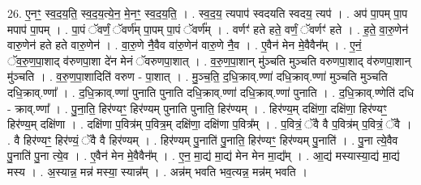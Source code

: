 \documentclass[17pt]{extarticle}
\begin{document}
26. ए॒नꣳ॒॒ स्व॒द॒य॒ति॒ स्व॒द॒य॒त्ये॒न॒ मे॒नꣳ॒॒ स्व॒द॒य॒ति॒ । . स्व॒द॒य॒ त्यपाप॑ स्वदयति स्वदय॒ त्यप॑ । . अप॑ पा॒पम् पा॒प मपाप॑ पा॒पम् । . पा॒पं ॅवर्णं॒ ॅवर्ण॑म् पा॒पम् पा॒पं ॅवर्ण᳚म् । . वर्णꣳ॑ हते हते॒ वर्णं॒ ॅवर्णꣳ॑ हते । . ह॒ते॒ वा॒रु॒णेन॑ वारु॒णेन॑ हते हते वारु॒णेन॑ । . वा॒रु॒णे नै॒वैव वा॑रु॒णेन॑ वारु॒णे नै॒व । . ए॒वैन॑ मेन मे॒वैवैन᳚म् । . ए॒नं॒ ॅव॒रु॒ण॒पा॒शाद् व॑रुणपा॒शा दे॑न मेनं ॅवरुणपा॒शात् । . व॒रु॒ण॒पा॒शान् मु॑ञ्चति मुञ्चति वरुणपा॒शाद् व॑रुणपा॒शान् मु॑ञ्चति । . व॒रु॒ण॒पा॒शादिति॑ वरुण - पा॒शात् । . मु॒ञ्च॒ति॒ द॒धि॒क्राव्.ण्णा॑ दधि॒क्राव्.ण्णा॑ मुञ्चति मुञ्चति दधि॒क्राव्.ण्णा᳚ । . द॒धि॒क्राव्.ण्णा॑ पुनाति पुनाति दधि॒क्राव्.ण्णा॑ दधि॒क्राव्.ण्णा॑ पुनाति । . द॒धि॒क्राव्.ण्णेति॑ दधि - क्राव्.ण्णा᳚ । . पु॒ना॒ति॒ हिर॑ण्यꣳ॒॒ हिर॑ण्यम् पुनाति पुनाति॒ हिर॑ण्यम् । . हिर॑ण्य॒म् दक्षि॑णा॒ दक्षि॑णा॒ हिर॑ण्यꣳ॒॒ हिर॑ण्य॒म् दक्षि॑णा । . दक्षि॑णा प॒वित्र॑म् प॒वित्र॒म् दक्षि॑णा॒ दक्षि॑णा प॒वित्र᳚म् । . प॒वित्रं॒ ॅवै वै प॒वित्र॑म् प॒वित्रं॒ ॅवै । . वै हिर॑ण्यꣳ॒॒ हिर॑ण्यं॒ ॅवै वै हिर॑ण्यम् । . हिर॑ण्यम् पु॒नाति॑ पु॒नाति॒ हिर॑ण्यꣳ॒॒ हिर॑ण्यम् पु॒नाति॑ । . पु॒ना त्ये॒वैव पु॒नाति॑ पु॒ना त्ये॒व । . ए॒वैन॑ मेन मे॒वैवैन᳚म् । . ए॒न॒ मा॒द्य॑ मा॒द्य॑ मेन मेन मा॒द्य᳚म् । . आ॒द्य॑ मस्यास्या॒द्य॑ मा॒द्य॑ मस्य । . अ॒स्यान्न॒ मन्न॑ मस्या॒ स्यान्न᳚म् । . अन्न॑म् भवति भव॒त्यन्न॒ मन्न॑म् भवति । \newline
\end{document}
